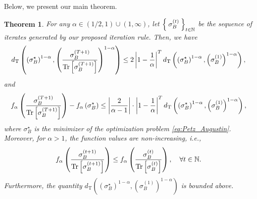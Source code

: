 \documentclass{article}
\newtheorem{theorem}{Theorem}[section]
\begin{document}
Below, we present our main theorem.
\begin{theorem}
    \label{ineq:FvalConv}
    For any $\alpha\in(1/2,1)\cup(1,\infty)$, let $\Set{\sigma_B^{(t)}}_{t\in\mathbb{N}}$ be the sequence of iterates generated by our proposed iteration rule.
    Then, we have 
    \begin{align}
        d_{\mathrm{T}}\left(\left(\sigma_B^{\star}\right)^{1-\alpha},\left(\frac{\sigma_B^{(T+1)}}{\Tr\left[\sigma_B^{(T+1)}\right]}\right)^{1-\alpha}\right)
        \leq 2\left|1-\frac{1}{\alpha}\right|^{T} d_{\mathrm{T}}\left(\left(\sigma_B^{\star}\right)^{1-\alpha},\left(\sigma_B^{(1)}\right)^{1-\alpha}\right),
    \end{align}
    and
    \begin{align}
        f_{\alpha}\left(\frac{\sigma_B^{(T+1)}}{\Tr\left[\sigma_B^{(T+1)}\right]}\right)-f_{\alpha}\left(\sigma_B^{\star}\right)
        \leq \left|\frac{2}{\alpha-1}\right|\cdot\left|1-\frac{1}{\alpha}\right|^{T} d_{\mathrm{T}}\left(\left(\sigma_B^{\star}\right)^{1-\alpha},\left(\sigma_B^{(1)}\right)^{1-\alpha}\right),
    \end{align}
    where $\sigma_B^{\star}$ is the minimizer of the optimization problem \eqref{eq:Petz_Augustin}.
    Moreover, for $\alpha > 1$, the function values are non-increasing, i.e.,
    \begin{align}
        f_{\alpha}\left(\frac{\sigma_B^{(t+1)}}{\Tr\left[\sigma_B^{(t+1)}\right]}\right)
        \leq
        f_{\alpha}\left(\frac{\sigma_B^{(t)}}{\Tr\left[\sigma_B^{(t)}\right]}\right),\quad\forall t\in\mathbb{N}.
    \end{align}
    Furthermore, the quantity $d_{\mathrm{T}}\left(\left(\sigma_B^{\star}\right)^{1-\alpha},\left(\sigma_B^{(1)}\right)^{1-\alpha}\right)$ is bounded above.
\end{theorem}
\end{document}
